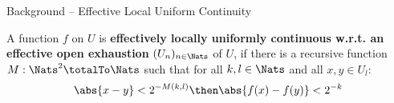 \begin{frame}{Background -- Effective Local Uniform Continuity}
    \pause
    \begin{definition}
        A function $f$ on $U$ is \textbf{ effectively locally uniformly continuous \textbf{\textcolor{BrickRed}{w.r.t.\null{} an effective open exhaustion}}} $(U_n)_{n \in \Nats}$ of $U$, \pause if there is a recursive function $M:\Nats^2\totalTo \Nats$ such that for all $k,l \in \Nats$ and all $x,y \in U_l$:
        \[
        \abs{x-y}<2^{-M(k,l)} \then \abs{f(x)-f(y)}<2^{-k}
        \]    
    \end{definition}
\end{frame}